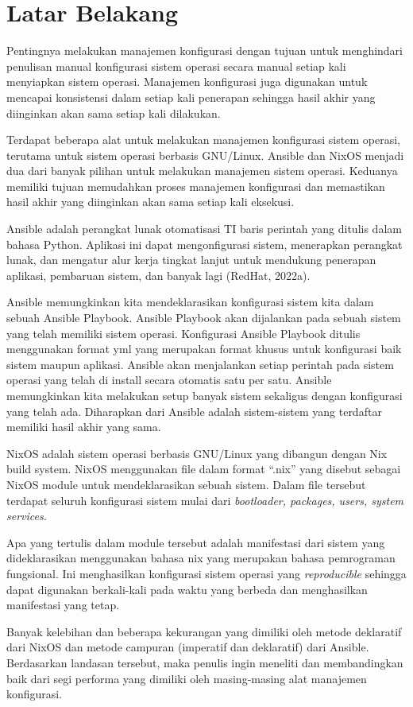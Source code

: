 \documentclass[10pt,]{report}
\begin{document}
\section{Latar Belakang}
\begin{adjustwidth}{0.70cm}{}
	\vspace{-3mm}
	\hspace\parindent
	Pentingnya melakukan manajemen konfigurasi dengan tujuan untuk menghindari
	penulisan manual konfigurasi sistem operasi secara manual setiap kali
	menyiapkan sistem operasi. Manajemen konfigurasi juga digunakan untuk
	mencapai konsistensi dalam setiap kali penerapan sehingga hasil akhir yang
	diinginkan akan sama setiap kali dilakukan.

	Terdapat beberapa alat untuk melakukan manajemen konfigurasi sistem operasi,
	terutama untuk sistem operasi berbasis GNU/Linux. Ansible dan NixOS menjadi
	dua dari banyak pilihan untuk melakukan manajemen sistem operasi. Keduanya
	memiliki tujuan memudahkan proses manajemen konfigurasi dan memastikan hasil
	akhir yang diinginkan akan sama setiap kali eksekusi.

	Ansible adalah perangkat lunak otomatisasi TI baris perintah yang ditulis
	dalam bahasa Python. Aplikasi ini dapat mengonfigurasi sistem, menerapkan
	perangkat lunak, dan mengatur alur kerja tingkat lanjut untuk mendukung
	penerapan aplikasi, pembaruan sistem, dan banyak lagi (RedHat, 2022a).

	Ansible memungkinkan kita mendeklarasikan konfigurasi sistem kita dalam
	sebuah Ansible Playbook. Ansible Playbook akan dijalankan pada sebuah sistem
	yang telah memiliki sistem operasi. Konfigurasi Ansible Playbook ditulis
	menggunakan format yml yang merupakan format khusus untuk konfigurasi baik
	sistem maupun aplikasi. Ansible akan menjalankan setiap perintah pada sistem
	operasi yang telah di install secara otomatis satu per satu. Ansible
	memungkinkan kita melakukan setup banyak sistem sekaligus dengan konfigurasi
	yang telah ada. Diharapkan dari Ansible adalah sistem-sistem yang terdaftar
	memiliki hasil akhir yang sama.

	NixOS adalah sistem operasi berbasis GNU/Linux yang dibangun dengan Nix build
	system. NixOS menggunakan file dalam format “.nix” yang disebut sebagai NixOS
	module untuk mendeklarasikan sebuah sistem. Dalam file tersebut terdapat
	seluruh konfigurasi sistem mulai dari \textit{bootloader, packages, users, system services.}

	Apa yang tertulis dalam module tersebut adalah manifestasi dari sistem yang
	dideklarasikan menggunakan bahasa nix yang merupakan bahasa pemrograman
	fungsional. Ini menghasilkan konfigurasi sistem operasi yang \textit{reproducible}
	sehingga dapat digunakan berkali-kali pada waktu yang berbeda dan
	menghasilkan manifestasi yang tetap.

	Banyak kelebihan dan beberapa kekurangan yang dimiliki oleh metode deklaratif
	dari NixOS dan metode campuran (imperatif dan deklaratif) dari Ansible.
	Berdasarkan landasan tersebut, maka penulis ingin meneliti dan membandingkan
	baik dari segi performa yang dimiliki oleh masing-masing alat manajemen
	konfigurasi.
\end{adjustwidth}
\vspace{3mm}
\end{document}
